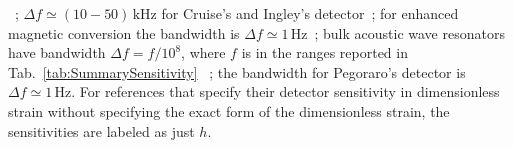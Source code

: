 \documentclass[11pt,a4paper]{article}
\newcommand{\centered}[1]{\begin{tabular}{l} #1 \end{tabular}}
\begin{document}
~\cite{arvanitaki:2016gw,aggarwal2020searching}; $\Delta f \simeq (10-50) \, \text{kHz}$ for Cruise's and Ingley's detector~\cite{Cruise3, Cruise:2006zt}; for enhanced magnetic conversion the bandwidth is $\Delta f \simeq 1 \, \text{Hz}$~\cite{Li}; bulk acoustic wave resonators have bandwidth $\Delta f = f/10^8$, where $f$ is in the ranges reported in Tab.~\ref{tab:SummarySensitivity}
~\cite{Goryachev:2014ab}; the bandwidth for Pegoraro's detector is $\Delta f \simeq 1 \, \text{Hz}$. For references that specify their detector sensitivity in dimensionless strain without specifying the exact form of the dimensionless strain, the sensitivities are labeled as just \(h\).


\begin{table}[!htbp]
\end{table}
\end{document}
